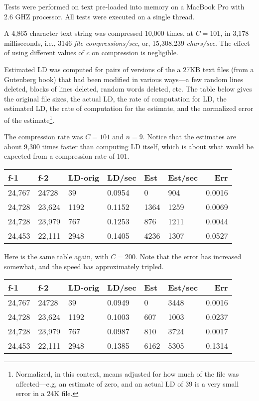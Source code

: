 \documentclass[html]{article}    %
\begin{document}
Tests were performed on text pre-loaded into memory on a MacBook Pro with 2.6 GHZ processor. 
All tests were executed on a single thread. 

A 4,865 character text string was compressed 10,000 times, at $C=101$, in 3,178 milliseconds, i.e., 3146 {\em file compressions/sec},
or, 15,308,239 {\em chars/sec}.  The effect of using different values of $c$ on compression is negligible.

Estimated LD was computed for pairs of versions of the a 27KB text files (from a Gutenberg book) that had been modified in 
various ways---a few random lines deleted, blocks of lines deleted, random words deleted, etc. 
The table below gives the original file sizes, the actual LD, the rate  of computation for LD,  the estimated LD, 
the rate of computation for the estimate, and the normalized error of the estimate\footnote{ 
	Normalized, in this context, means adjusted for how much of the file was affected---e.g, an estimate of zero, 
	and an actual LD of 39 is a very small error in a 24K file.
}.
\vspace {10 mm}

The compression rate was $C=101$ and $n=9$. Notice that the estimates are about 9,300 times faster than computing LD itself,
which is about what would be expected from a compression rate of 101.

\vspace {10 mm}
\begin {tabular} {|l|l|l|l|l|l|r|} \hline \hline
 f-1  		& f-2 		& LD-orig	&LD/sec		& Est 		& Est/sec	 & Err  	\\ \hline
 \hline
 24,767 	& 24728  	& 39  		& 0.0954	& 0  	 	& 904 	 	& 0.0016 	\\ \hline
 24,728 	& 23,624  	& 1192  	& 0.1152	& 1364   	& 1259 	 	& 0.0069 	\\ \hline
 24,728 	& 23,979  	& 767  		& 0.1253	& 876   	& 1211 	 	& 0.0044 	\\ \hline
 24,453 	& 22,111  	& 2948  	& 0.1405	& 4236   	& 1307 	 	& 0.0527 	\\ \hline
\end {tabular}
\vspace {10 mm}


Here is the same table again, with $C=200$.
Note that the error has increased somewhat,  and the speed has approximately tripled.

\vspace {10 mm}
\begin {tabular} {|l|l|l|l|l|l|r|} \hline \hline
 f-1  		& f-2 		& LD-orig	&LD/sec		& Est 		& Est/sec	 & Err  	\\ \hline
 \hline
 24,767 	& 24728  	& 39  		& 0.0949	& 0  	 	& 3448 	 	& 0.0016 	\\ \hline
 24,728 	& 23,624  	& 1192  	& 0.1003	& 607   	& 1003 	 	& 0.0237 	\\ \hline
 24,728 	& 23,979  	& 767  		& 0.0987	& 810   	& 3724 	 	& 0.0017 	\\ \hline
 24,453 	& 22,111  	& 2948  	& 0.1385	& 6162   	& 5305 	 	& 0.1314 	\\ \hline
\end {tabular}
\vspace {10 mm}
\end{document}
